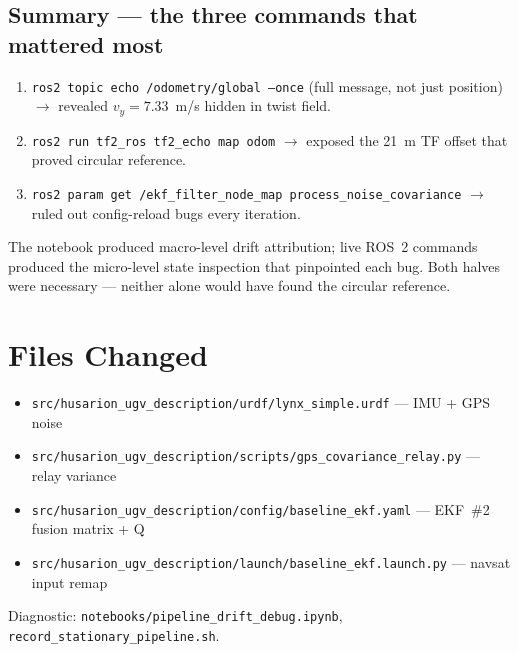 \documentclass[11pt,a4paper]{article}
\begin{document}
\subsection{Summary --- the three commands that mattered most}

\begin{enumerate}[noitemsep]
\item \texttt{ros2 topic echo /odometry/global --once} (full message, not just position)
      $\to$ revealed $v_y\!=\!7.33$~m/s hidden in twist field.
\item \texttt{ros2 run tf2\_ros tf2\_echo map odom} $\to$ exposed the 21~m TF offset that
      proved circular reference.
\item \texttt{ros2 param get /ekf\_filter\_node\_map process\_noise\_covariance} $\to$
      ruled out config-reload bugs every iteration.
\end{enumerate}

\noindent
The notebook produced macro-level drift attribution; live ROS~2 commands produced the
micro-level state inspection that pinpointed each bug. Both halves were necessary ---
neither alone would have found the circular reference.

\section{Files Changed}

\begin{itemize}[noitemsep]
\item \texttt{src/husarion\_ugv\_description/urdf/lynx\_simple.urdf} --- IMU + GPS noise
\item \texttt{src/husarion\_ugv\_description/scripts/gps\_covariance\_relay.py} --- relay variance
\item \texttt{src/husarion\_ugv\_description/config/baseline\_ekf.yaml} --- EKF~\#2 fusion matrix + Q
\item \texttt{src/husarion\_ugv\_description/launch/baseline\_ekf.launch.py} --- navsat input remap
\end{itemize}

\noindent
Diagnostic: \texttt{notebooks/pipeline\_drift\_debug.ipynb}, \texttt{record\_stationary\_pipeline.sh}.
\end{document}
